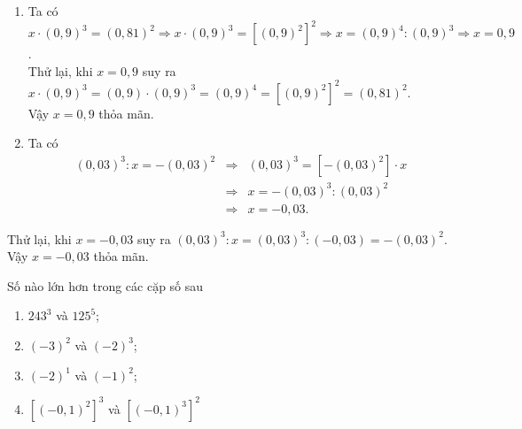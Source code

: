\begin{bt}
{\begin{enumerate}
			Vậy $x = 2$ thỏa mãn.
			\item Ta có $x\cdot \left(0{,}9\right)^{3} = \left(0{,}81\right)^2\Rightarrow x\cdot \left(0{,}9\right)^{3} = \left[\left(0{,}9\right)^2\right]^2\Rightarrow x = \left(0{,}9\right)^{4}\colon \left(0{,}9\right)^{3}\Rightarrow x = 0{,}9$.\\
			Thử lại, khi $x = 0{,}9$ suy ra $x\cdot \left(0{,}9\right)^{3} = \left(0{,}9\right)\cdot \left(0{,}9\right)^{3} = \left(0{,}9\right)^{4} = \left[\left(0{,}9\right)^{2}\right]^{2} = \left(0{,}81\right)^{2}$.\\
			Vậy $x = 0{,}9$ thỏa mãn.
			\item Ta có
			\begin{eqnarray*}
				\left(0{,}03\right)^3\colon x = - \left(0{,}03\right)^2&\Rightarrow& \left(0{,}03\right)^3 = \left[- \left(0{,}03\right)^2\right]\cdot x\\
				&\Rightarrow& x = - \left(0{,}03\right)^3\colon \left(0{,}03\right)^2\\
				&\Rightarrow& x = - 0{,}03.
			\end{eqnarray*}
		\end{enumerate}	
		Thử lại, khi $x = - 0{,}03$ suy ra $\left(0{,}03\right)^3\colon x  =  \left(0{,}03\right)^3\colon \left(- 0{,}03\right) = - \left(0{,}03\right)^2$.\\
		Vậy $x = - 0{,}03$ thỏa mãn.
	}
\end{bt}

\begin{bt}%
	Số nào lớn hơn trong các cặp số sau
	\begin{enumerate}
		\item $243^3$ và $125^5$;
		\item $\left(- 3\right)^2$ và $(-2)^3$;
		\item $\left(- 2\right)^1$ và $\left(- 1\right)^2$;
		\item $\left[\left(-0{,}1\right)^2\right]^3$ và $\left[\left(-0{,}1\right)^3\right]^2$
	\end{enumerate}
\end{bt}


